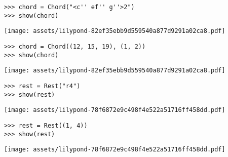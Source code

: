 \begin{abjadbookoutput}
\begin{singlespacing}
\vspace{-0.5\baselineskip}
\begin{lstlisting}
>>> chord = Chord("<c'' ef'' g''>2")
>>> show(chord)
\end{lstlisting}
\noindent\texttt{[image: assets/lilypond-82ef35ebb9d559540a877d9291a02ca8.pdf]}
\end{singlespacing}
\end{abjadbookoutput}

\begin{comment}
<abjad>
chord = Chord((12, 15, 19), (1, 2))
show(chord)
</abjad>
\end{comment}

\begin{abjadbookoutput}
\begin{singlespacing}
\vspace{-0.5\baselineskip}
\begin{lstlisting}
>>> chord = Chord((12, 15, 19), (1, 2))
>>> show(chord)
\end{lstlisting}
\noindent\texttt{[image: assets/lilypond-82ef35ebb9d559540a877d9291a02ca8.pdf]}
\end{singlespacing}
\end{abjadbookoutput}

\begin{comment}
<abjad>
rest = Rest("r4")
show(rest)
</abjad>
\end{comment}

\begin{abjadbookoutput}
\begin{singlespacing}
\vspace{-0.5\baselineskip}
\begin{lstlisting}
>>> rest = Rest("r4")
>>> show(rest)
\end{lstlisting}
\noindent\texttt{[image: assets/lilypond-78f6872e9c498f4e522a51716ff458dd.pdf]}
\end{singlespacing}
\end{abjadbookoutput}

\begin{comment}
<abjad>
rest = Rest((1, 4))
show(rest)
</abjad>
\end{comment}

\begin{abjadbookoutput}
\begin{singlespacing}
\vspace{-0.5\baselineskip}
\begin{lstlisting}
>>> rest = Rest((1, 4))
>>> show(rest)
\end{lstlisting}
\noindent\texttt{[image: assets/lilypond-78f6872e9c498f4e522a51716ff458dd.pdf]}
\end{singlespacing}
\end{abjadbookoutput}

